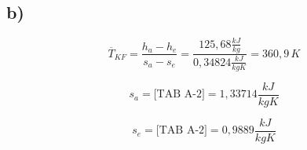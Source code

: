 

\subsection*{b)}

\[
\overline{T}_{KF} = \frac{h_a - h_e}{s_a - s_e} = \frac{125,68 \frac{kJ}{kg}}{0,34824 \frac{kJ}{kgK}} = \boxed{360,9 \, K}
\]

\[
s_a = \text{[TAB A-2]} = 1,33714 \frac{kJ}{kgK}
\]

\[
s_e = \text{[TAB A-2]} = 0,9889 \frac{kJ}{kgK}
\]